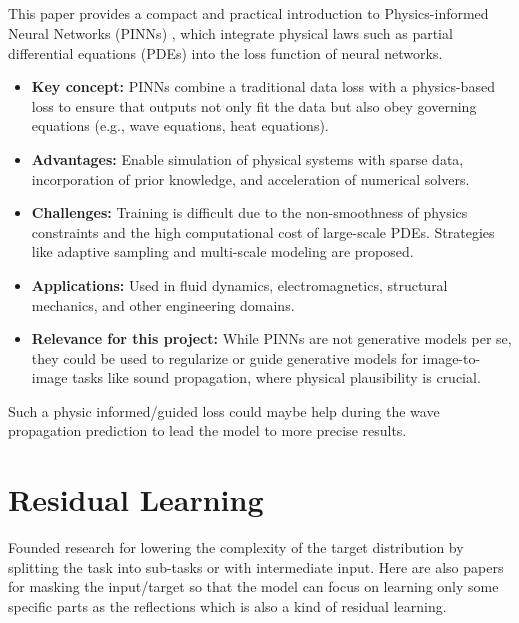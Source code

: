 		\newpage
			
		\subsection{}
			This paper provides a compact and practical introduction to Physics-informed Neural Networks (PINNs) \cite{raissi_physics_2017}, which integrate physical laws such as partial differential equations (PDEs) into the loss function of neural networks.
			
			\begin{itemize}[itemsep=1mm, parsep=0pt]
				\item \textbf{Key concept:} PINNs combine a traditional data loss with a physics-based loss to ensure that outputs not only fit the data but also obey governing equations (e.g., wave equations, heat equations).
				\item \textbf{Advantages:} Enable simulation of physical systems with sparse data, incorporation of prior knowledge, and acceleration of numerical solvers.
				\item \textbf{Challenges:} Training is difficult due to the non-smoothness of physics constraints and the high computational cost of large-scale PDEs. Strategies like adaptive sampling and multi-scale modeling are proposed.
				\item \textbf{Applications:} Used in fluid dynamics, electromagnetics, structural mechanics, and other engineering domains.
				\item \textbf{Relevance for this project:} While PINNs are not generative models per se, they could be used to regularize or guide generative models for image-to-image tasks like sound propagation, where physical plausibility is crucial.
			\end{itemize}
			
			Such a physic informed/guided loss could maybe help during the wave propagation prediction to lead the model to more precise results.
			
	
	
	\newpage
	\section{Residual Learning}  %
	\label{sec:lit-complex-focus-only}
		Founded research for lowering the complexity of the target distribution by splitting the task into sub-tasks or with intermediate input. Here are also papers for masking the input/target so that the model can focus on learning only some specific parts as the reflections which is also a kind of residual learning.
	
